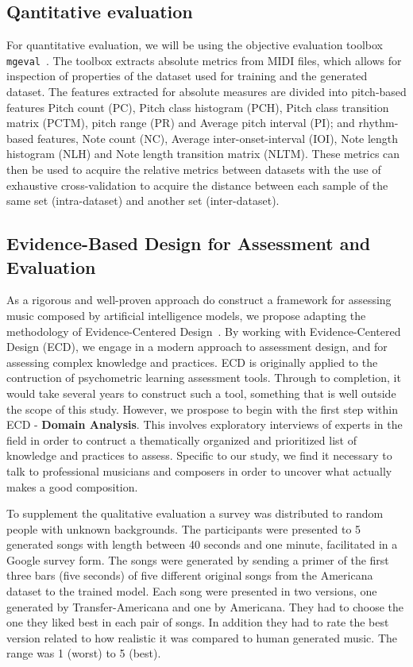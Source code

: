 \documentclass{IEEEtran}
\begin{document}
\subsection{Qantitative evaluation}

For quantitative evaluation, we will be using the objective evaluation
toolbox \lstinline|mgeval|~\cite{yang2020evaluation}.
The toolbox extracts absolute
metrics from MIDI files, which allows for inspection of properties of the
dataset used for training and the generated dataset. The features extracted
for absolute measures are divided into pitch-based features Pitch count (PC),
Pitch class histogram (PCH), Pitch class transition matrix (PCTM), pitch
range (PR) and Average pitch interval (PI); and rhythm-based features, Note
count (NC), Average inter-onset-interval (IOI), Note length histogram (NLH)
and Note length transition matrix (NLTM). These metrics can then be used to
acquire the relative metrics between datasets with the use of exhaustive
cross-validation to acquire the distance between each sample of the same set
(intra-dataset) and another set (inter-dataset).

\subsection{Evidence-Based Design for Assessment and Evaluation}

As a rigorous and well-proven approach do construct a framework for assessing
music composed by artificial intelligence models, we propose adapting the
methodology of Evidence-Centered
Design~\cite{mislevy2003focus,mislevy2017evidence}.
By working with
Evidence-Centered Design (ECD), we engage in a modern approach to assessment
design, and for assessing complex knowledge and practices. ECD is originally
applied to the contruction of psychometric learning assessment tools. Through
to completion, it would take several years to construct such a tool,
something that is well outside the scope of this study. However, we prospose
to begin with the first step within ECD - \textbf{Domain Analysis}. This
involves exploratory interviews of experts in the field in order to contruct
a thematically organized and prioritized list of knowledge and practices to
assess. Specific to our study, we find it necessary to talk to professional
musicians and composers in order to uncover what actually makes a good
composition.

To supplement the qualitative evaluation a survey was distributed to
random people with unknown backgrounds. The participants were presented to 5
generated songs with length between 40 seconds and one minute,
facilitated in a Google survey form.
The songs were generated by sending a primer of the first three bars
(five seconds) of five different original songs from the Americana dataset to the
trained model. Each song were presented in two versions, one generated by
Transfer-Americana and one by Americana. They had to choose the one they
liked best in each pair of songs. In addition they had to rate the best
version related to how realistic it was compared to human generated music.
The range was 1 (worst) to 5 (best).
\end{document}
